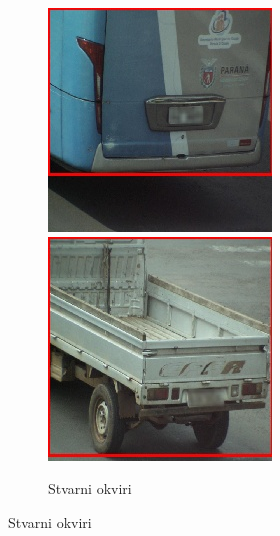 \documentclass[12pt,oneside]{memoir}
\begin{document}
\begin{figure}
\begin{subfigure}[b]{0.35\textwidth}
        \includegraphics[width=\textwidth]{matfmaster/vgg16_base/bus_real.jpg}
        \includegraphics[width=\textwidth]{matfmaster/vgg16_base/truck_real.jpg}
        \caption{Stvarni okviri}

\end{subfigure}
\end{figure}
\end{document}
